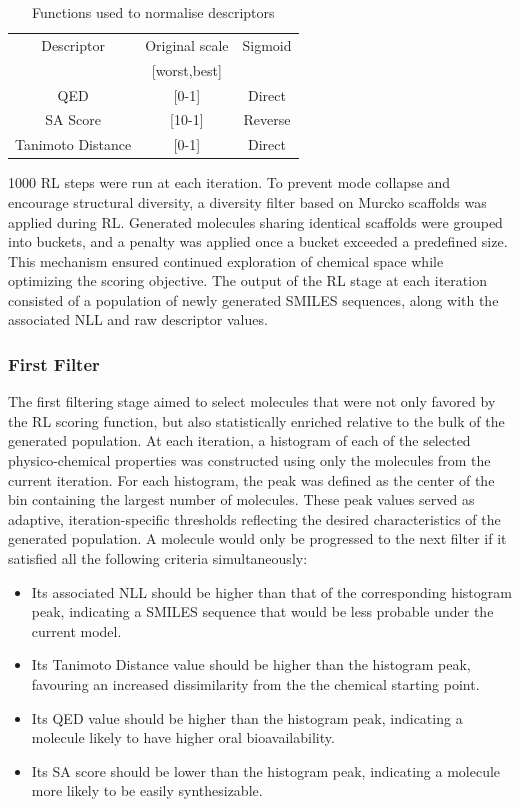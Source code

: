 \begin{table}[H]
  \caption{Functions used to normalise descriptors}
  \label{tab:rl_descriptors}
  \centering
  \begin{tabular}{ccc}
    \hline
    Descriptor & Original scale & Sigmoid\\
               & [worst,best]   &        \\
    \hline
    QED & [0-1] & Direct \\
    SA Score & [10-1] & Reverse \\
    Tanimoto Distance & [0-1] & Direct \\
    \hline
  \end{tabular}
\end{table}

1000 RL steps were run at each iteration. To prevent mode collapse and encourage structural diversity, a diversity filter based on Murcko scaffolds was applied during RL. Generated molecules sharing identical scaffolds were grouped into buckets, and a penalty was applied once a bucket exceeded a predefined size. This mechanism ensured continued exploration of chemical space while optimizing the scoring objective. The output of the RL stage at each iteration consisted of a population of newly generated SMILES sequences, along with the associated NLL and raw descriptor values. 

\subsubsection{First Filter}
The first filtering stage aimed to select molecules that were not only favored by the RL scoring function, but also statistically enriched relative to the bulk of the generated population. At each iteration, a histogram of each of the selected physico-chemical properties was constructed using only the molecules from the current iteration. For each histogram, the peak was defined as the center of the bin containing the largest number of molecules. These peak values served as adaptive, iteration-specific thresholds reflecting the desired characteristics of the generated population. A molecule would only be progressed to the next filter if it satisfied all the following criteria simultaneously:
\begin{itemize}
    \item Its associated NLL should be higher than that of the corresponding histogram peak, indicating a SMILES sequence that would be less probable under the current model.
    \item Its Tanimoto Distance value should be higher than the histogram peak, favouring an increased dissimilarity from the the chemical starting point.
    \item Its QED value should be higher than the histogram peak, indicating  a molecule likely to have higher oral bioavailability.
    \item Its SA score should be lower than the histogram peak, indicating a molecule more likely to be easily synthesizable.
\end{itemize}

